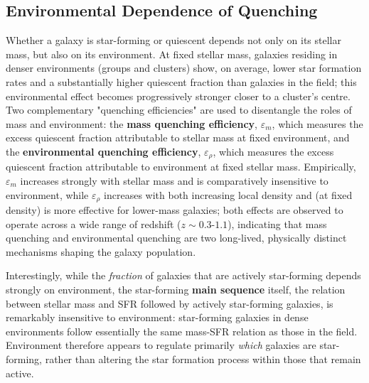 \subsection{Environmental Dependence of Quenching} \label{subsec:environment_quenching}

Whether a galaxy is star-forming or quiescent depends not only on its stellar mass, but also on its environment. At fixed stellar mass, galaxies residing in denser environments (groups and clusters) show, on average, lower star formation rates and a substantially higher quiescent fraction than galaxies in the field; this environmental effect becomes progressively stronger closer to a cluster's centre. Two complementary "quenching efficiencies" are used to disentangle the roles of mass and environment: the \textbf{mass quenching efficiency}, $\varepsilon_m$, which measures the excess quiescent fraction attributable to stellar mass at fixed environment, and the \textbf{environmental quenching efficiency}, $\varepsilon_\rho$, which measures the excess quiescent fraction attributable to environment at fixed stellar mass. Empirically, $\varepsilon_m$ increases strongly with stellar mass and is comparatively insensitive to environment, while $\varepsilon_\rho$ increases with both increasing local density and (at fixed density) is more effective for lower-mass galaxies; both effects are observed to operate across a wide range of redshift ($z \sim 0.3$-$1.1$), indicating that mass quenching and environmental quenching are two long-lived, physically distinct mechanisms shaping the galaxy population.

\begin{minipage}{0.56\textwidth}
    Interestingly, while the \emph{fraction} of galaxies that are actively star-forming depends strongly on environment, the star-forming \textbf{main sequence} itself, the relation between stellar mass and SFR followed by actively star-forming galaxies, is remarkably insensitive to environment: star-forming galaxies in dense environments follow essentially the same mass-SFR relation as those in the field. Environment therefore appears to regulate primarily \emph{which} galaxies are star-forming, rather than altering the star formation process within those that remain active.
\end{minipage}%
\hfill
\begin{minipage}{0.4\textwidth}
    \centering
\end{minipage}

